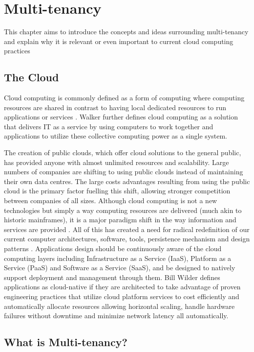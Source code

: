 \chapter{Multi-tenancy}
This chapter aims to introduce the concepts and ideas surrounding multi-tenancy and explain why it is relevant or even important to current cloud computing practices

\section{The Cloud}

Cloud computing is commonly defined as a form of computing where computing resources are shared in contrast to having local dedicated resources to run applications or services \cite{webopedia}. Walker \cite{GraceWalker} further defines cloud computing as a solution that delivers IT as a service by using computers to work together and applications to utilize these collective computing power as a single system.
 
The creation of public clouds, which offer cloud solutions to the general public, has provided anyone with almost unlimited resources and scalability. Large numbers of companies are shifting to using public clouds instead of maintaining their own data centres. The large costs advantages resulting from using the public cloud is the primary factor fuelling this shift, allowing stronger competition between companies of all sizes. Although cloud computing is not a new technologies but simply a way computing resources are delivered (much akin to historic mainframes), it is a major paradigm shift in the way information and services are provided \cite{GraceWalker}. All of this has created a need for radical redefinition of our current computer architectures, software, tools, persistence mechanism and design patterns \cite{GraceWalker}. Applications design should be continuously aware of the cloud computing layers including Infrastructure as a Service (IaaS), Platform as a Service (PaaS) and Software as a Service (SaaS), and be designed to natively support deployment and management through them. Bill Wilder \cite{Wilder2012-so} defines applications as cloud-native if they are architected to take advantage of proven engineering practices that utilize cloud platform services to cost efficiently and automatically allocate resources allowing horizontal scaling, handle hardware failures without downtime and minimize network latency all automatically.


\section{What is Multi-tenancy?}

